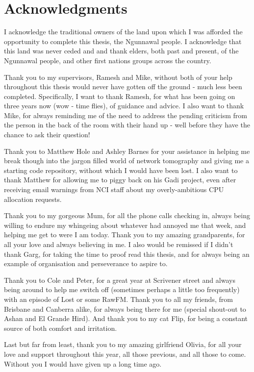 \chapter*{Acknowledgments}
I acknowledge the traditional owners of the land upon which I was afforded the opportunity to complete this thesis, the Ngunnawal people. I acknowledge that this land was never ceded and and thank elders, both past and present, of the Ngunnawal people, and other first nations groups across the country.\par
Thank you to my supervisors, Ramesh and Mike, without both of your help throughout this thesis would never have gotten off the ground - much less been completed. Specifically, I want to thank Ramesh, for what has been going on three years now (wow - time flies), of guidance and advice. I also want to thank Mike, for always reminding me of the need to address the pending criticism from the person in the back of the room with their hand up - well before they have the chance to ask their question!\par
Thank you to Matthew Hole and Ashley Barnes for your assistance in helping me break though into the jargon filled world of network tomography and giving me a starting code repository, without which I would have been lost. I also want to thank Matthew for allowing me to piggy back on his Gadi project, even after receiving email warnings from NCI staff about my overly-ambitious CPU allocation requests.\par
Thank you to my gorgeous Mum, for all the phone calls checking in, always being willing to endure my whingeing about whatever had annoyed me that week, and helping me get to were I am today. Thank you to my amazing grandparents, for all your love and always believing in me. I also would be remissed if I didn't thank Garg, for taking the time to proof read this thesis, and for always being an example of organisation and perseverance to aspire to.\par
Thank you to Cole and Peter, for a great year at Scrivener street and always being around to help me switch off (sometimes perhaps a little too frequently) with an episode of Lost or some RawFM. Thank you to all my friends, from Brisbane and Canberra alike, for always being there for me (special shout-out to Ashan and El Grande Hird). And thank you to my cat Flip, for being a constant source of both comfort and irritation.\par
Last but far from least, thank you to my amazing girlfriend Olivia, for all your love and support throughout this year, all those previous, and all those to come. Without you I would have given up a long time ago. 